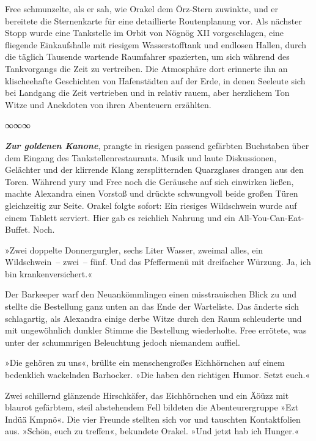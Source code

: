 Free schmunzelte, als er sah, wie Orakel dem Örz-Stern zuwinkte, und er bereitete die Sternenkarte für eine detaillierte Routenplanung vor. Als nächster Stopp wurde eine Tankstelle im Orbit von Nögnög XII vorgeschlagen, eine fliegende Einkaufshalle mit riesigem Wasserstofftank und endlosen Hallen, durch die täglich Tausende wartende Raumfahrer spazierten, um sich während des Tankvorgangs die Zeit zu vertreiben. Die Atmosphäre dort erinnerte ihn an klischeehafte Geschichten von Hafenstädten auf der Erde, in denen Seeleute sich bei Landgang die Zeit vertrieben und in relativ rauem, aber herzlichem Ton Witze und Anekdoten von ihren Abenteuern erzählten.

\begin{center}
∞∞∞
\end{center}

\textit{\textbf{Zur goldenen Kanone}}, prangte in riesigen passend gefärbten Buchstaben über dem Eingang des Tankstellenrestaurants. Musik und laute Diskussionen, Gelächter und der klirrende Klang zersplitternden Quarzglases drangen aus den Toren. Während yury und Free noch die Geräusche auf sich einwirken ließen, machte Alexandra einen Vorstoß und drückte schwungvoll beide großen Türen gleichzeitig zur Seite. Orakel folgte sofort: Ein riesiges Wildschwein wurde auf einem Tablett serviert. Hier gab es reichlich Nahrung und ein All-You-Can-Eat-Buffet. Noch.

»Zwei doppelte Donnergurgler, sechs Liter Wasser, zweimal alles, ein Wildschwein~– zwei~– fünf. Und das Pfeffermenü mit dreifacher Würzung. Ja, ich bin krankenversichert.«

Der Barkeeper warf den Neuankömmlingen einen misstrauischen Blick zu und stellte die Bestellung ganz unten an das Ende der Warteliste. Das änderte sich schlagartig, als Alexandra einige derbe Witze durch den Raum schleuderte und mit ungewöhnlich dunkler Stimme die Bestellung wiederholte. Free errötete, was unter der schummrigen Beleuchtung jedoch niemandem auffiel.

»Die gehören zu uns«, brüllte ein menschengroßes Eichhörnchen auf einem bedenklich wackelnden Barhocker. »Die haben den richtigen Humor. Setzt euch.«

Zwei schillernd glänzende Hirschkäfer, das Eichhörnchen und ein Äöüzz mit blaurot gefärbtem, steil abstehendem Fell bildeten die Abenteurergruppe »Ezt Indüä Kmpnö«. Die vier Freunde stellten sich vor und tauschten Kontaktfolien aus. »Schön, euch zu treffen«, bekundete Orakel. »Und jetzt hab ich Hunger.«


